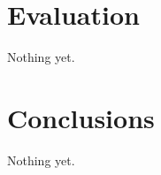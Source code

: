 \documentclass[
a4paper,     %
12pt         %
]{scrartcl}  %
\begin{document}
\newpage
\section{Evaluation}
Nothing yet.



\newpage
\section{Conclusions}
Nothing yet.

\appendix  %

 

 
\end{document}
